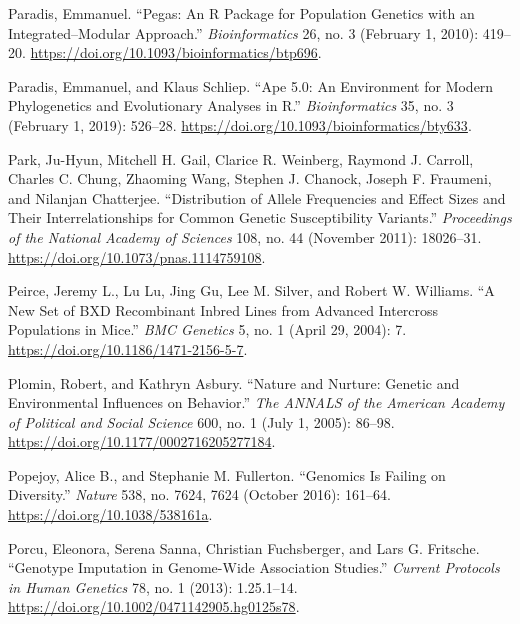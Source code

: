 \documentclass[
]{book}
\newlength{\cslhangindent}
\newlength{\cslentryspacingunit} %
\newenvironment{CSLReferences}[2] %
 {%
  \setlength{\parindent}{0pt}
  \ifodd #1
  \let\oldpar\par
  \def\par{\hangindent=\cslhangindent\oldpar}
  \fi
  \setlength{\parskip}{#2\cslentryspacingunit}
 }%
 {}
\begin{document}
\begin{CSLReferences}{1}{0}
\leavevmode{}%
Paradis, Emmanuel. {``Pegas: An {R} Package for Population Genetics with an Integrated--Modular Approach.''} \emph{Bioinformatics} 26, no. 3 (February 1, 2010): 419--20. \url{https://doi.org/10.1093/bioinformatics/btp696}.

\leavevmode{}%
Paradis, Emmanuel, and Klaus Schliep. {``Ape 5.0: An Environment for Modern Phylogenetics and Evolutionary Analyses in {R}.''} \emph{Bioinformatics} 35, no. 3 (February 1, 2019): 526--28. \url{https://doi.org/10.1093/bioinformatics/bty633}.

\leavevmode{}%
Park, Ju-Hyun, Mitchell H. Gail, Clarice R. Weinberg, Raymond J. Carroll, Charles C. Chung, Zhaoming Wang, Stephen J. Chanock, Joseph F. Fraumeni, and Nilanjan Chatterjee. {``Distribution of Allele Frequencies and Effect Sizes and Their Interrelationships for Common Genetic Susceptibility Variants.''} \emph{Proceedings of the National Academy of Sciences} 108, no. 44 (November 2011): 18026--31. \url{https://doi.org/10.1073/pnas.1114759108}.

\leavevmode{}%
Peirce, Jeremy L., Lu Lu, Jing Gu, Lee M. Silver, and Robert W. Williams. {``A New Set of {BXD} Recombinant Inbred Lines from Advanced Intercross Populations in Mice.''} \emph{BMC Genetics} 5, no. 1 (April 29, 2004): 7. \url{https://doi.org/10.1186/1471-2156-5-7}.

\leavevmode{}%
Plomin, Robert, and Kathryn Asbury. {``Nature and {Nurture}: {Genetic} and {Environmental Influences} on {Behavior}.''} \emph{The ANNALS of the American Academy of Political and Social Science} 600, no. 1 (July 1, 2005): 86--98. \url{https://doi.org/10.1177/0002716205277184}.

\leavevmode{}%
Popejoy, Alice B., and Stephanie M. Fullerton. {``Genomics Is Failing on Diversity.''} \emph{Nature} 538, no. 7624, 7624 (October 2016): 161--64. \url{https://doi.org/10.1038/538161a}.

\leavevmode{}%
Porcu, Eleonora, Serena Sanna, Christian Fuchsberger, and Lars G. Fritsche. {``Genotype {Imputation} in {Genome-Wide Association Studies}.''} \emph{Current Protocols in Human Genetics} 78, no. 1 (2013): 1.25.1--14. \url{https://doi.org/10.1002/0471142905.hg0125s78}.


\end{CSLReferences}
\end{document}
